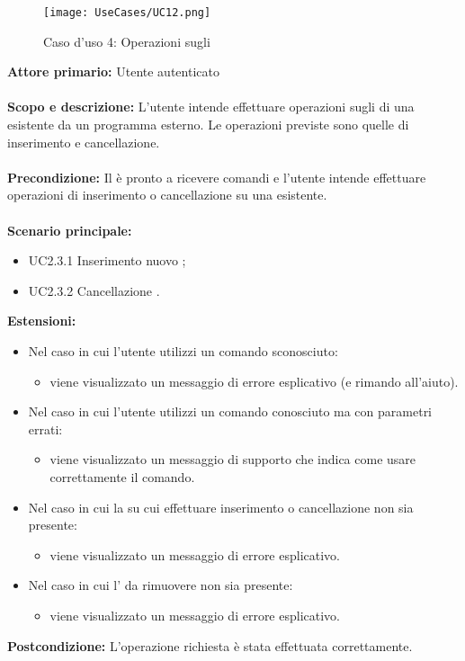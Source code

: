 \documentclass{scalatekids-article}
\begin{document}
\begin{figure}[H]
  \begin{center}
    \texttt{[image: UseCases/UC12.png]}
    \caption*{Caso d'uso 4: Operazioni sugli }
  \end{center}
\end{figure}
\textbf{Attore primario:} Utente autenticato\\ \\
\textbf{Scopo e descrizione:} L'utente intende effettuare operazioni sugli  di una  esistente da un programma  esterno. Le operazioni previste sono quelle di inserimento e cancellazione.\\ \\
\textbf{Precondizione:} Il  è pronto a ricevere comandi e l'utente intende effettuare operazioni di inserimento o cancellazione su una  esistente.\\ \\
\textbf{Scenario principale:}
\begin{itemize}
\item UC2.3.1 Inserimento nuovo ;
\item UC2.3.2 Cancellazione .
\end{itemize}
\textbf{Estensioni:}
\begin{itemize}
\item Nel caso in cui l'utente utilizzi un comando sconosciuto:
  \begin{itemize}
  \item viene visualizzato un messaggio di errore esplicativo (e rimando all'aiuto).
  \end{itemize}
\item Nel caso in cui l'utente utilizzi un comando conosciuto ma con parametri errati:
  \begin{itemize}
  \item viene visualizzato un messaggio di supporto che indica come usare correttamente il comando.
  \end{itemize}
\item Nel caso in cui la  su cui effettuare inserimento o cancellazione non sia presente:
  \begin{itemize}
  \item viene visualizzato un messaggio di errore esplicativo.
  \end{itemize}
\item Nel caso in cui l' da rimuovere non sia presente:
  \begin{itemize}
  \item viene visualizzato un messaggio di errore esplicativo.
  \end{itemize}
\end{itemize}
\textbf{Postcondizione:} L'operazione richiesta è stata effettuata correttamente.
\end{document}
